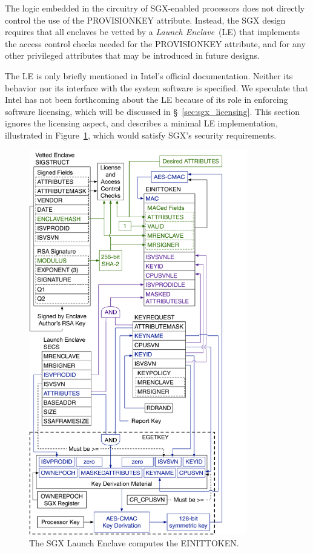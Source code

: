 The logic embedded in the circuitry of SGX-enabled processors does not directly
control the use of the PROVISIONKEY attribute. Instead, the SGX design requires
that all enclaves be vetted by a \textit{Launch Enclave}~(LE) that implements
the access control checks needed for the PROVISIONKEY attribute, and for any
other privileged attributes that may be introduced in future designs.

The LE is only briefly mentioned in Intel's official documentation. Neither its
behavior nor its interface with the system software is specified. We speculate
that Intel has not been forthcoming about the LE because of its role in
enforcing software licensing, which will be discussed in
\S~\ref{sec:sgx_licensing}. This section ignores the licensing aspect, and
describes a minimal LE implementation, illustrated in
Figure~\ref{fig:sgx_einittoken}, which would satisfy SGX's security
requirements.

\begin{figure}[hbt!]
  \centering
  \includegraphics[width=95mm]{figures/sgx_einittoken.pdf}
  \caption{
    The SGX Launch Enclave computes the EINITTOKEN.
  }
  \label{fig:sgx_einittoken}
\end{figure}

